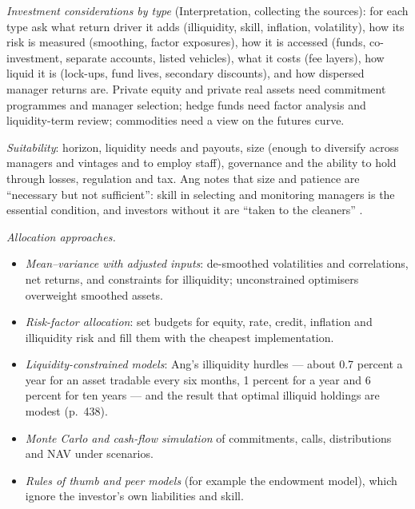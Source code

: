 \begin{qfmethod}\label{meth:alternatives-allocation-approaches}
 \emph{Investment considerations by type} (Interpretation, collecting the sources): for each type ask what return driver it adds (illiquidity, skill, inflation, volatility), how its risk is measured (smoothing, factor exposures), how it is accessed (funds, co-investment, separate accounts, listed vehicles), what it costs (fee layers), how liquid it is (lock-ups, fund lives, secondary discounts), and how dispersed manager returns are. Private equity and private real assets need commitment programmes and manager selection; hedge funds need factor analysis and liquidity-term review; commodities need a view on the futures curve.

\emph{Suitability}: horizon, liquidity needs and payouts, size (enough to diversify across managers and vintages and to employ staff), governance and the ability to hold through losses, regulation and tax. Ang notes that size and patience are ``necessary but not sufficient'': skill in selecting and monitoring managers is the essential condition, and investors without it are ``taken to the cleaners'' \citep[p.~439]{s7-ang}.

\emph{Allocation approaches.}
\begin{itemize}
\item \emph{Mean--variance with adjusted inputs}: de-smoothed volatilities and correlations, net returns, and constraints for illiquidity; unconstrained optimisers overweight smoothed assets.
\item \emph{Risk-factor allocation}: set budgets for equity, rate, credit, inflation and illiquidity risk and fill them with the cheapest implementation.
\item \emph{Liquidity-constrained models}: Ang's illiquidity hurdles --- about 0.7 percent a year for an asset tradable every six months, 1 percent for a year and 6 percent for ten years --- and the result that optimal illiquid holdings are modest (p.~438).
\item \emph{Monte Carlo and cash-flow simulation} of commitments, calls, distributions and NAV under scenarios.
\item \emph{Rules of thumb and peer models} (for example the endowment model), which ignore the investor's own liabilities and skill.
\end{itemize}


\end{qfmethod}
